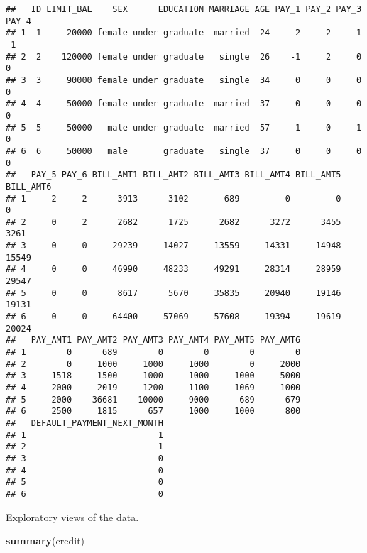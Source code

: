 \documentclass[]{article}
\newenvironment{Shaded}{\begin{snugshade}}{\end{snugshade}}
\newcommand{\KeywordTok}[1]{\textcolor[rgb]{0.13,0.29,0.53}{\textbf{#1}}}
\newcommand{\NormalTok}[1]{#1}
\begin{document}
\begin{verbatim}
##   ID LIMIT_BAL    SEX      EDUCATION MARRIAGE AGE PAY_1 PAY_2 PAY_3 PAY_4
## 1  1     20000 female under graduate  married  24     2     2    -1    -1
## 2  2    120000 female under graduate   single  26    -1     2     0     0
## 3  3     90000 female under graduate   single  34     0     0     0     0
## 4  4     50000 female under graduate  married  37     0     0     0     0
## 5  5     50000   male under graduate  married  57    -1     0    -1     0
## 6  6     50000   male       graduate   single  37     0     0     0     0
##   PAY_5 PAY_6 BILL_AMT1 BILL_AMT2 BILL_AMT3 BILL_AMT4 BILL_AMT5 BILL_AMT6
## 1    -2    -2      3913      3102       689         0         0         0
## 2     0     2      2682      1725      2682      3272      3455      3261
## 3     0     0     29239     14027     13559     14331     14948     15549
## 4     0     0     46990     48233     49291     28314     28959     29547
## 5     0     0      8617      5670     35835     20940     19146     19131
## 6     0     0     64400     57069     57608     19394     19619     20024
##   PAY_AMT1 PAY_AMT2 PAY_AMT3 PAY_AMT4 PAY_AMT5 PAY_AMT6
## 1        0      689        0        0        0        0
## 2        0     1000     1000     1000        0     2000
## 3     1518     1500     1000     1000     1000     5000
## 4     2000     2019     1200     1100     1069     1000
## 5     2000    36681    10000     9000      689      679
## 6     2500     1815      657     1000     1000      800
##   DEFAULT_PAYMENT_NEXT_MONTH
## 1                          1
## 2                          1
## 3                          0
## 4                          0
## 5                          0
## 6                          0
\end{verbatim}

Exploratory views of the data.

\begin{Shaded}
\begin{Highlighting}[]
\KeywordTok{summary}\NormalTok{(credit)}
\end{Highlighting}
\end{Shaded}
\end{document}

